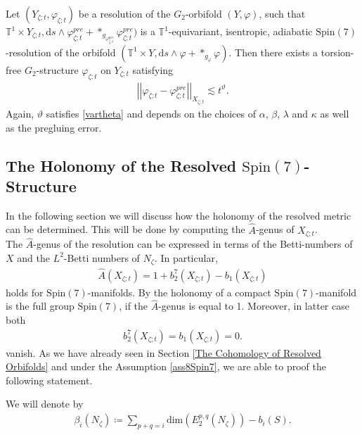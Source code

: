 \documentclass[psamsfonts]{amsart}
\theoremstyle{plain}
\theoremstyle{definition}{
\newtheorem{defi}{Definition}[section]
\newtheorem{ass}{Assumption}
\newtheorem*{nota}{Notation}}
\theoremstyle{remark}{
\newtheorem{rem}{Remark}
\newtheorem{ex}{Example}}
\theoremstyle{plain}{
\newtheorem{thm}{Theorem}[section]
\newtheorem{lem}{Lemma}[section]
\newtheorem{cor}{Corollary}[section]
\newtheorem{prop}{Proposition}[section]
\newtheorem{con}{Conjecture}[section]}
\newcommand{\m}[1]{{\mathrm{#1}}}
\begin{document}
\begin{cor}
\label{ExistenceofTFG2Resolutions}
Let $(Y_{\zeta;t},\varphi_{\zeta;t})$ be a resolution of the $G_2$-orbifold $(Y,\varphi)$, such that $\mathbb{T}^1\times Y_{\zeta;t},\m{d}s\wedge\varphi^{pre}_{\zeta;t}+*_{g_{\varphi^{pre}_{\zeta;t}}}\varphi^{pre}_{\zeta;t})$ is a $\mathbb{T}^1$-equivariant, isentropic, adiabatic $\m{Spin}(7)$-resolution of the orbifold $(\mathbb{T}^1\times Y ,\m{d}s\wedge\varphi+*_{g_\varphi}\varphi)$. Then there exists a torsion-free $G_2$-structure $\varphi_{\zeta;t}$ on $Y_{\zeta;t}$ satisfying 
\begin{align}
    \left|\left|\varphi_{\zeta;t}-\varphi^{pre}_{\zeta;t}\right|\right|_{X_{\zeta;t}}\lesssim t^{\vartheta}.
\end{align}
Again, $\vartheta$ satisfies \eqref{vartheta} and depends on the choices of $\alpha$, $\beta$, $\lambda$ and $\kappa$ as well as the pregluing error.
\end{cor}


\subsection{The Holonomy of the Resolved $\m{Spin}(7)$-Structure}
\label{The Holonomy of the Resolved Spin(7)-Structure}

In the following section we will discuss how the holonomy of the resolved metric can be determined. This will be done by computing the $\hat{A}$-genus of $X_{\zeta;t}$.\\

The $\hat{A}$-genus of the resolution can be expressed in terms of the Betti-numbers of $X$ and the $L^2$-Betti numbers of $N_\zeta$. In particular,
\begin{align}
    \hat{A}(X_{\zeta;t})=1+b^7_2(X_{\zeta;t})-b_1(X_{\zeta;t})
\end{align}
holds for $\m{Spin}(7)$-manifolds. By \cite[Thm. 10.6.1]{joyce2000compact} the holonomy of a compact $\m{Spin}(7)$-manifold is the full group $\m{Spin}(7)$, if the $\hat{A}$-genus is equal to 1. Moreover, in latter case both 
\begin{align*}
    b^7_2(X_{\zeta;t})=b_1(X_{\zeta;t})=0.
\end{align*}
vanish. As we have already seen in Section \ref{The Cohomology of Resolved Orbifolds} and under the Assumption \ref{ass8Spin7}, we are able to proof the following statement.

\begin{nota}
    We will denote by 
    \begin{align*}
\beta_i(N_\zeta)\coloneqq \sum_{p+q=i}\m{dim}(E^{p,q}_2(N_\zeta))-b_i(S).
    \end{align*}    
\end{nota}
\end{document}
